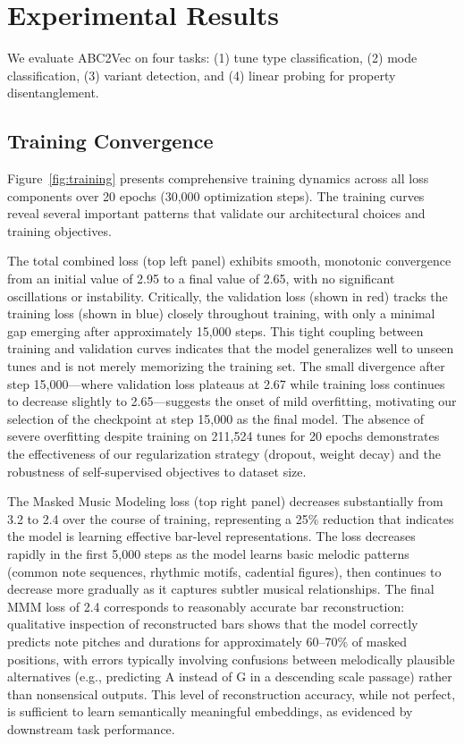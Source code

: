 \documentclass[]{interact}
\theoremstyle{plain}
\theoremstyle{definition}
\theoremstyle{remark}
\begin{document}
\section{Experimental Results}\label{sec:results}

We evaluate ABC2Vec on four tasks: (1) tune type classification, (2) mode classification, (3) variant detection, and (4) linear probing for property disentanglement.

\subsection{Training Convergence}

Figure~\ref{fig:training} presents comprehensive training dynamics across all loss components over 20 epochs (30,000 optimization steps). The training curves reveal several important patterns that validate our architectural choices and training objectives.

The total combined loss (top left panel) exhibits smooth, monotonic convergence from an initial value of 2.95 to a final value of 2.65, with no significant oscillations or instability. Critically, the validation loss (shown in red) tracks the training loss (shown in blue) closely throughout training, with only a minimal gap emerging after approximately 15,000 steps. This tight coupling between training and validation curves indicates that the model generalizes well to unseen tunes and is not merely memorizing the training set. The small divergence after step 15,000---where validation loss plateaus at 2.67 while training loss continues to decrease slightly to 2.65---suggests the onset of mild overfitting, motivating our selection of the checkpoint at step 15,000 as the final model. The absence of severe overfitting despite training on 211,524 tunes for 20 epochs demonstrates the effectiveness of our regularization strategy (dropout, weight decay) and the robustness of self-supervised objectives to dataset size.

The Masked Music Modeling loss (top right panel) decreases substantially from 3.2 to 2.4 over the course of training, representing a 25\% reduction that indicates the model is learning effective bar-level representations. The loss decreases rapidly in the first 5,000 steps as the model learns basic melodic patterns (common note sequences, rhythmic motifs, cadential figures), then continues to decrease more gradually as it captures subtler musical relationships. The final MMM loss of 2.4 corresponds to reasonably accurate bar reconstruction: qualitative inspection of reconstructed bars shows that the model correctly predicts note pitches and durations for approximately 60--70\% of masked positions, with errors typically involving confusions between melodically plausible alternatives (e.g., predicting A instead of G in a descending scale passage) rather than nonsensical outputs. This level of reconstruction accuracy, while not perfect, is sufficient to learn semantically meaningful embeddings, as evidenced by downstream task performance.
\end{document}
